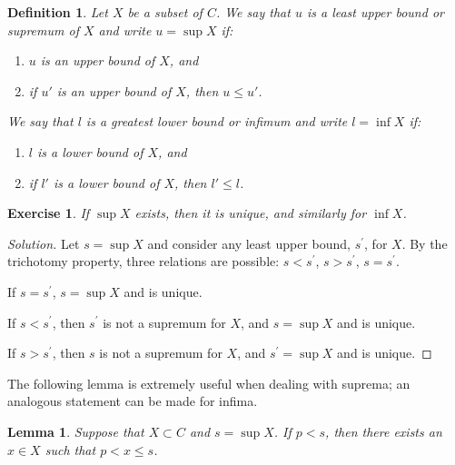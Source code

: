 \documentclass{amsart}
\newtheorem{lemma}[theorem]{Lemma}
\newtheorem{definition}[theorem]{Definition}
\newtheorem{exercise}[theorem]{Exercise}
\newcommand{\1}{\mathds{1}}
\numberwithin{equation}{section}
\numberwithin{theorem}{section}
\begin{document}
\begin{definition}  Let $X$ be a subset of $C$.  We say that $u$ is a \emph{least upper bound} or {\em supremum} of $X$ and write $u = \sup X$ if:
\begin{enumerate}
\item  $u$ is an upper bound of $X$, and
\item  if $u'$ is an upper bound of $X$, then $u \leq u'$.
\end{enumerate}
We say that $l$ is a \emph{greatest lower bound} or {\em infimum} and write $l = \inf X$ if:
\begin{enumerate}
\item $l$ is a lower bound of $X$, and
\item if $l'$ is a lower bound of $X$, then $l' \leq l$.
\end{enumerate}
\end{definition}


\begin{exercise}  If $\sup X$ exists, then it is unique, and similarly for $\inf X$.
\end{exercise}

\begin{proof}[Solution]
	Let $s = \sup X$ and consider any least upper bound, $s^\prime$, for $X$. By the trichotomy property, three relations are possible: $s<s^\prime$, $s>s^\prime$, $s=s^\prime$.
	
	If $s=s^\prime$, $s = \sup X$ and is unique.
	
	If $s<s^\prime$, then $s^\prime$ is not a supremum for $X$, and $s = \sup X$ and is unique. 

	If $s>s^\prime$, then $s$ is not a supremum for $X$, and $s^\prime = \sup X$ and is unique.
\end{proof}





The following lemma is extremely useful when dealing with suprema; an analogous statement can be made for infima.
\begin{lemma} 
\label{lem1}
Suppose that $X \subset C$ and $s = \sup X$.
If $p<s$, then there exists an $x\in X$ such that $p < x \le s$.
\end{lemma} 
\end{document}
